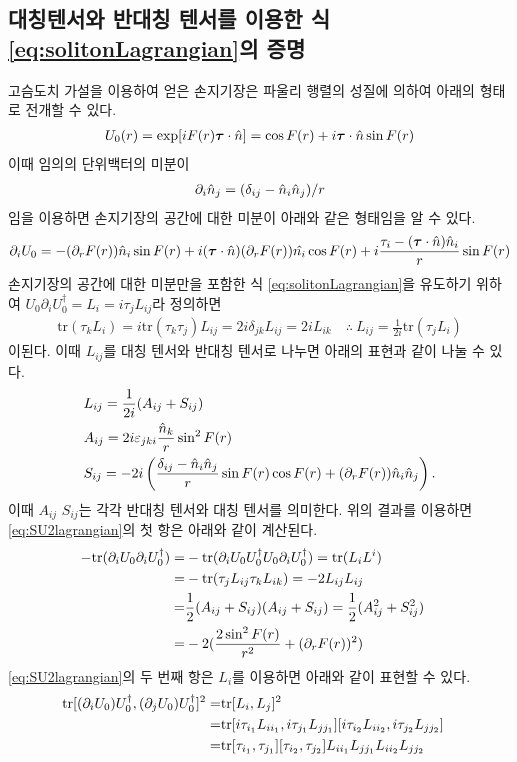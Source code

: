 \documentclass[superscriptaddress,
nofootinbib,byrevtex,fleqn,prd,12pt]{revtex4}
\newcommand{\tr}{\mathrm{tr}}
\begin{document}
\subsection{대칭텐서와 반대칭 텐서를 이용한 식\eqref{eq:solitonLagrangian}의 증명}\label{51}
고슴도치 가설을 이용하여 얻은 손지기장은 파울리 행렬의 성질에 의하여 아래의 형태로 전개할 수 있다.
\begin{align}
U_{0}(r) = \exp [iF(r)\bm{\tau} \cdot \hat{n}]=\cos F(r)+i\bm{\tau}\cdot\Hat{n}\sin F(r)
\end{align}
이때 임의의 단위백터의 미분이
\begin{align}
  \partial_i\Hat{n}_j=(\delta_{ij}-\Hat{n}_i\Hat{n}_j)/r
\end{align}
임을 이용하면 손지기장의 공간에 대한 미분이 아래와 같은 형태임을 알 수 있다.
\begin{align}
\partial_iU_0=-(\partial_{r}F(r))\Hat{n}_i\sin F(r)+i(\bm{\tau}\cdot\Hat{n})(\partial_{r}F(r))\Hat{n_i}\cos F(r)+i\frac{\tau_i-(\bm{\tau}\cdot\Hat{n})\Hat{n}_i}{r}\sin F(r)
\end{align}
손지기장의 공간에 대한 미분만을 포함한 식 \eqref{eq:solitonLagrangian}을 유도하기 위하여 $U_0\partial_iU_0^\dagger=L_i=i\tau_jL_{ij}$라 정의하면
\begin{align}
\tr(\tau_kL_i)=i\tr(\tau_k\tau_j)L_{ij}=2i\delta_{jk}L_{ij}=2iL_{ik}\quad \therefore\ L_{ij}=\frac{1}{2i}\tr(\tau_jL_i)
\end{align}
이된다. 이때 $L_{ij}$를 대칭 텐서와 반대칭 텐서로 나누면 아래의 표현과 같이 나눌 수 있다.
\begin{align}
&L_{ij}=\frac{1}{2i}(A_{ij}+S_{ij})\\
&A_{ij}=2i\varepsilon_{jki}\frac{\Hat{n}_k}{r}\sin^2F(r) \\
&S_{ij}=-2i\left(\frac{\delta_{ij}-\Hat{n}_i\Hat{n}_j}{r}\sin F(r)\cos F(r)+(\partial_{r}F(r))\Hat{n}_i\Hat{n}_j\right).
\end{align}
이때 $A_{ij}$ $S_{ij}$는 각각 반대칭 텐서와 대칭 텐서를 의미한다. 위의 결과를 이용하면 \eqref{eq:SU2lagrangian}의 첫 항은 아래와 같이 계산된다.
\begin{align}
-\tr(\partial_iU_0\partial_iU_0^\dagger)=&-\tr(\partial_iU_0U_0^\dagger U_0\partial_iU_0^\dagger)=\tr(L_iL^i)\cr
=&-\tr(\tau_jL_{ij}\tau_kL_{ik})=-2L_{ij}L_{ij}\cr
=&\frac{1}{2}(A_{ij}+S_{ij})(A_{ij}+S_{ij})=\frac{1}{2}(A_{ij}^2+S_{ij}^2)\cr
=&-2(\frac{2\sin^2F(r)}{r^2}+(\partial_{r}F(r))^{2})
\end{align}
\eqref{eq:SU2lagrangian}의 두 번째 항은 $L_{i}$를 이용하면 아래와 같이 표현할 수 있다.
\begin{align}
\tr[(\partial_i U_0)U_0^\dagger,(\partial_j U_0)U_0^\dagger]^2=&\tr[L_i,L_j]^2\cr
=&\tr[i\tau_{i_1}L_{ii_1},i\tau_{j_1}L_{jj_1}][i\tau_{i_2}L_{ii_2},i\tau_{j_2}L_{jj_2}]\cr
=&\tr[\tau_{i_1},\tau_{j_1}][\tau_{i_2},\tau_{j_2}]L_{ii_1}L_{jj_1}L_{ii_2}L_{jj_2}
\end{align}
\end{document}

